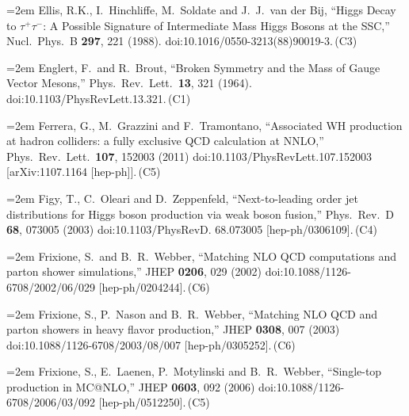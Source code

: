 \documentclass[letter,12pt]{article}
\def\xbibitem#1#2#3{\noindent\hangindent=2em #2\,(#3)}
\begin{document}
\xbibitem{Ellis:1987xu}{Ellis, R.K., I.~Hinchliffe, M.~Soldate and J.~J.~van der Bij,
  ``Higgs Decay to $\tau^+\tau^-$: A Possible Signature of Intermediate Mass Higgs Bosons at the SSC,''
  Nucl.\ Phys.\ B {\bf 297}, 221 (1988).
  doi:10.1016/0550-3213(88)90019-3.}{C3}

\xbibitem{Englert:1964et}{Englert, F.\ and R.~Brout,
  ``Broken Symmetry and the Mass of Gauge Vector Mesons,''
  Phys.\ Rev.\ Lett.\  {\bf 13}, 321 (1964).
  doi:10.1103/PhysRevLett.13.321.}{C1}

\xbibitem{Ferrera:2011bk}{Ferrera, G., M.~Grazzini and F.~Tramontano,
  ``Associated WH production at hadron colliders: a fully exclusive QCD calculation at NNLO,''
  Phys.\ Rev.\ Lett.\  {\bf 107}, 152003 (2011)
  doi:10.1103/PhysRevLett.107.152003
  [arXiv:1107.1164 [hep-ph]].}{C5}
  
\xbibitem{Figy:2003nv}{Figy, T., C.~Oleari and D.~Zeppenfeld,
  ``Next-to-leading order jet distributions for Higgs boson production via weak boson fusion,''
  Phys.\ Rev.\ D {\bf 68}, 073005 (2003)
  doi:10.1103/PhysRevD. 68.073005
  [hep-ph/0306109].}{C4}
  
\xbibitem{Frixione:2002ik}{Frixione, S.\ and B.~R.~Webber,
  ``Matching NLO QCD computations and parton shower simulations,''
  JHEP {\bf 0206}, 029 (2002)
  doi:10.1088/1126-6708/2002/06/029
  [hep-ph/0204244].}{C6}
  
\xbibitem{Frixione:2003ei}{Frixione, S., P.~Nason and B.~R.~Webber,
  ``Matching NLO QCD and parton showers in heavy flavor production,''
  JHEP {\bf 0308}, 007 (2003)
  doi:10.1088/1126-6708/2003/08/007
  [hep-ph/0305252].}{C6}
  
\xbibitem{Frixione:2005vw}{Frixione, S., E.~Laenen, P.~Motylinski and B.~R.~Webber,
  ``Single-top production in MC@NLO,''
  JHEP {\bf 0603}, 092 (2006)
  doi:10.1088/1126-6708/2006/03/092
  [hep-ph/0512250].}{C5}
  
\end{document}
